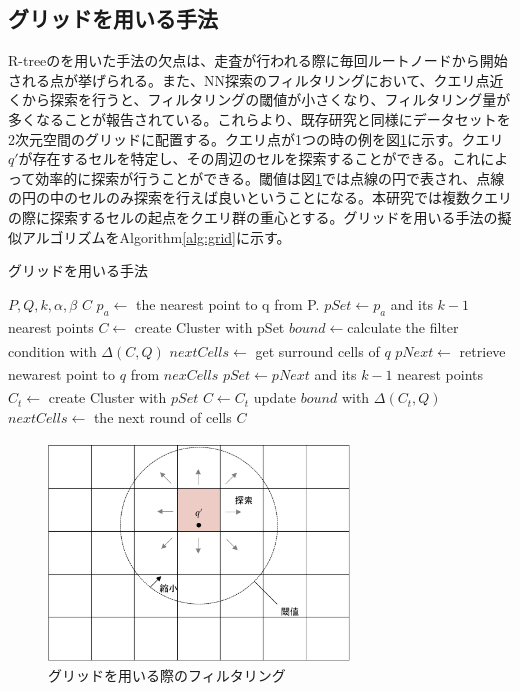\documentclass{deimj}
\begin{document}
\subsection{グリッドを用いる手法}
R-treeのを用いた手法の欠点は、走査が行われる際に毎回ルートノードから開始される点が挙げられる。また、NN探索のフィルタリングにおいて、クエリ点近くから探索を行うと、フィルタリングの閾値が小さくなり、フィルタリング量が多くなることが報告されている\cite{BNNH}。これらより、既存研究\cite{BNNH}と同様にデータセットを2次元空間のグリッドに配置する。クエリ点が1つの時の例を図\ref{fig:sol-grid-filter}に示す。クエリ$q'$が存在するセルを特定し、その周辺のセルを探索することができる。これによって効率的に探索が行うことができる。閾値は図\ref{fig:sol-grid-filter}では点線の円で表され、点線の円の中のセルのみ探索を行えば良いということになる。本研究では複数クエリの際に探索するセルの起点をクエリ群の重心とする。グリッドを用いる手法の擬似アルゴリズムをAlgorithm\ref{alg:grid}に示す。

\begin{algorithm}                      
\caption{グリッドを用いる手法}         
\label{alg:grid}
\begin{algorithmic}[1]                  
\renewcommand{\algorithmicrequire}{\textbf{Input:}}
\renewcommand{\algorithmicensure}{\textbf{Output:}}
\REQUIRE $P,Q,k,\alpha, \beta$
\ENSURE $C$
\STATE $p_a \xleftarrow[]{}$ the nearest point to q from P.
\STATE $pSet \xleftarrow{} p_a$ and its $k-1$ nearest points
\STATE $C \xleftarrow[]{}$ create Cluster with pSet
\STATE $bound \xleftarrow[]{} $calculate the filter condition with $\Delta(C,Q)$
\STATE $nextCells \xleftarrow[]{} $ get surround cells of $q$
\STATE $pNext \xleftarrow[]{}$ retrieve newarest point to $q$ from $nexCells$
\STATE $pSet \xleftarrow[]{} pNext$ and its $k-1$ nearest points
\STATE $C_t \xleftarrow{}$ create Cluster with $pSet$
\STATE $C \xleftarrow{} C_t$
\STATE update $bound$ with $\Delta(C_t,Q)$
\ENDIF
\STATE $nextCells \xleftarrow[]{} $ the next round of cells
\ENDWHILE
\RETURN $C$
\end{algorithmic}
\end{algorithm}


\begin{figure}[H]
	\centering
    \includegraphics[width=8cm]{images/sol-grid-filter.pdf}
    \caption{グリッドを用いる際のフィルタリング}
    \label{fig:sol-grid-filter}
\end{figure}
\end{document}
